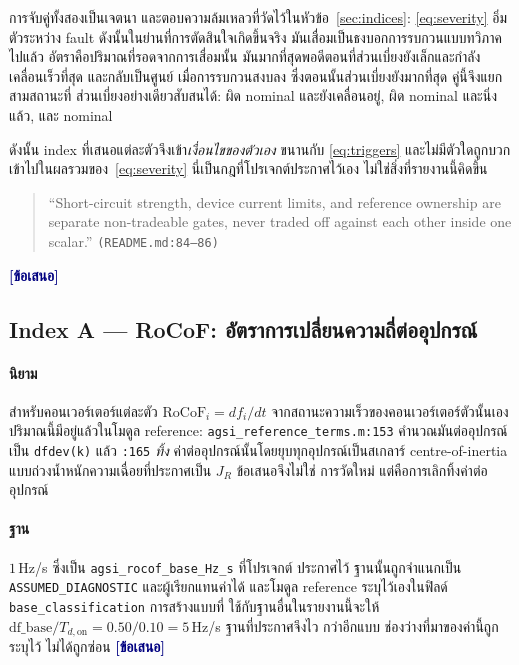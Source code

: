 \documentclass[12pt,a4paper]{article}
\theoremstyle{remark}
\newcommand{\code}[1]{\texttt{\small #1}}
\newcommand{\proposed}{\textcolor{navy}{\textbf{[ข้อเสนอ]}}}
\begin{document}
การจับคู่ทั้งสองเป็นเจตนา และตอบความล้มเหลวที่วัดไว้ในหัวข้อ~\ref{sec:indices}:
\eqref{eq:severity} อิ่มตัวระหว่าง fault ดังนั้นในย่านที่การตัดสินใจเกิดขึ้นจริง
มันเสื่อมเป็นธงบอกการรบกวนแบบทวิภาคไปแล้ว อัตราคือปริมาณที่รอดจากการเสื่อมนั้น
มันมากที่สุดพอดีตอนที่ส่วนเบี่ยงยังเล็กและกำลังเคลื่อนเร็วที่สุด และกลับเป็นศูนย์
เมื่อการรบกวนสงบลง ซึ่งตอนนั้นส่วนเบี่ยงยังมากที่สุด คู่นี้จึงแยกสามสถานะที่
ส่วนเบี่ยงอย่างเดียวสับสนได้: ผิด nominal และยังเคลื่อนอยู่, ผิด nominal และนิ่งแล้ว,
และ nominal

ดังนั้น index ที่เสนอแต่ละตัวจึงเข้า\emph{เงื่อนไขของตัวเอง} ขนานกับ
\eqref{eq:triggers} และไม่มีตัวใดถูกบวกเข้าไปในผลรวมของ~\eqref{eq:severity}
นี่เป็นกฎที่โปรเจกต์ประกาศไว้เอง ไม่ใช่สิ่งที่รายงานนี้คิดขึ้น

\begin{quote}\small
``Short-circuit strength, device current limits, and reference ownership are
separate non-tradeable gates, never traded off against each other inside one
scalar.'' \code{\hfill(README.md:84--86)}
\end{quote}
\proposed

\subsection{Index A --- RoCoF: อัตราการเปลี่ยนความถี่ต่ออุปกรณ์}

\paragraph{นิยาม} สำหรับคอนเวอร์เตอร์แต่ละตัว $\mathrm{RoCoF}_i = df_i/dt$
จากสถานะความเร็วของคอนเวอร์เตอร์ตัวนั้นเอง ปริมาณนี้มีอยู่แล้วในโมดูล reference:
\code{agsi\_reference\_terms.m:153} คำนวณมันต่ออุปกรณ์เป็น \code{dfdev(k)}
แล้ว \code{:165} \emph{ทิ้ง} ค่าต่ออุปกรณ์นั้นโดยยุบทุกอุปกรณ์เป็นสเกลาร์
centre-of-inertia แบบถ่วงน้ำหนักความเฉื่อยที่ประกาศเป็น $J_R$ ข้อเสนอจึงไม่ใช่
การวัดใหม่ แต่คือการเลิกทิ้งค่าต่ออุปกรณ์

\paragraph{ฐาน} $1$\,Hz/s ซึ่งเป็น \code{agsi\_rocof\_base\_Hz\_s} ที่โปรเจกต์
ประกาศไว้ ฐานนั้นถูกจำแนกเป็น \code{ASSUMED\_DIAGNOSTIC} และผู้เรียกแทนค่าได้
และโมดูล reference ระบุไว้เองในฟิลด์ \code{base\_classification} การสร้างแบบที่
ใช้กับฐานอื่นในรายงานนี้จะให้
$\text{df\_base}/T_{d,\mathrm{on}} = 0.50/0.10 = 5$\,Hz/s ฐานที่ประกาศจึงไว
กว่าอีกแบบ ช่องว่างที่มาของค่านี้ถูกระบุไว้ ไม่ได้ถูกซ่อน \proposed
\end{document}
